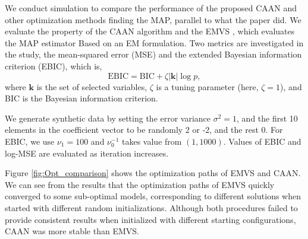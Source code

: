 We conduct simulation to compare the performance of the proposed CAAN and other optimization methods finding the MAP, parallel to what the paper did. We evaluate the property of the CAAN algorithm \citep{shin2021neuronized} and the EMVS \citep{rovckova2014emvs}, which evaluates the MAP estimator Based on an EM formulation. Two metrics are investigated in the study, the mean-squared error (MSE) and the extended Bayesian information criterion (EBIC), which is, 
$$ \text{EBIC} = \text{BIC} + \zeta |\bm{k}| \log p,$$
where $\bm{k}$ is the set of selected variables, $\zeta$ is a tuning parameter (here, $\zeta = 1$), and BIC is the Bayesian information criterion.

We generate synthetic data by setting the error variance $\sigma^2 = 1$, and the first 10 elements in the coefficient vector to be randomly 2 or -2, and the rest 0. For EBIC, we use $\nu_1 = 100$ and $\nu_0^{-1}$ takes value from $(1,1000)$. Values of EBIC and log-MSE are evaluated as iteration increases.

Figure \ref{fig:Opt_comparison} shows the optimization paths of EMVS and CAAN. We can see from the results that the optimization paths of EMVS quickly converged to some sub-optimal models, corresponding to different solutions when started with different random initializations. Although both procedures failed to provide consistent results when initialized with different starting configurations, CAAN was more stable than EMVS.

